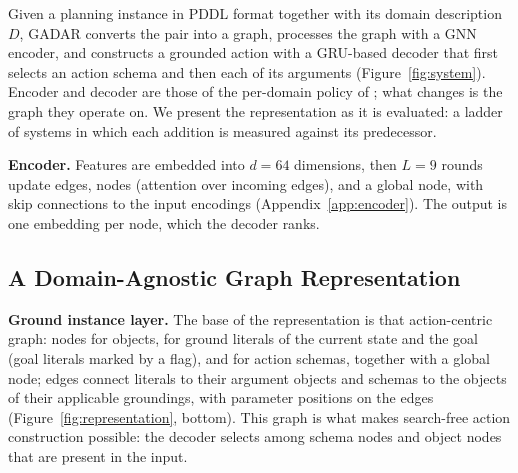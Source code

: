 \documentclass{article} %
\newcommand{\gadar}{GADAR}                 %
\begin{document}
Given a planning instance in PDDL format together with its domain
description $D$, \gadar{} converts the pair into a graph, processes the
graph with a GNN encoder, and constructs a grounded action with a GRU-based
decoder that first selects an action schema and then each of its arguments
(Figure~\ref{fig:system}). Encoder and decoder are those of the per-domain
policy of \citet{gabar}; what changes is
the graph they operate on. We present the representation as it is
evaluated: a ladder of systems in which each addition is measured against
its predecessor.

\textbf{Encoder.} Features are embedded into $d{=}64$ dimensions, then
$L{=}9$ rounds update edges, nodes (attention over incoming edges), and a
global node, with skip connections to the input encodings
(Appendix~\ref{app:encoder}). The output is one embedding per node, which
the decoder ranks.

\subsection{A Domain-Agnostic Graph Representation}

\textbf{Ground instance layer.} The base of the representation is that
action-centric graph: nodes for objects, for ground literals
of the current state and the goal (goal literals marked by a flag), and for
action schemas, together with a global node; edges connect literals to their
argument objects and schemas to the objects of their applicable groundings,
with parameter positions on the edges (Figure~\ref{fig:representation},
bottom). This graph is what makes search-free action construction possible:
the decoder selects among schema nodes and object nodes that are present in
the input.
\end{document}
